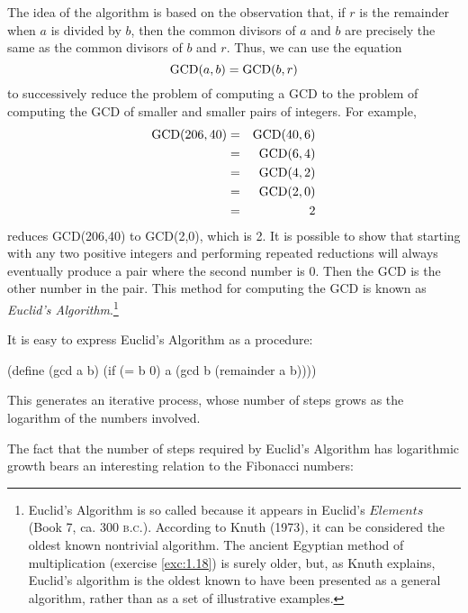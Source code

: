 The idea of the algorithm is based on the observation that, if $r$ is
the remainder when $a$ is divided by $b$, then the common divisors of
$a$ and $b$ are precisely the same as the common divisors of $b$ and
$r$.  Thus, we can use the equation $${\rm GCD}(a,b) = {\rm GCD}(b,r)$$
to successively reduce the problem of computing a GCD to the
problem of computing the GCD of smaller and smaller pairs of
integers.  For example,
\begin{eqnarray*}
 {\rm GCD}(206,40) & = & {\rm GCD}(40,6) \\
 & = & {\rm GCD}(6,4) \\
 & = & {\rm GCD}(4,2) \\
 & = & {\rm GCD}(2,0) \\
 & = & 2
\end{eqnarray*}
reduces GCD(206,40) to GCD(2,0), which is 2.  It is possible to show
that starting with any two positive integers and performing repeated
reductions will always eventually produce a pair where the second
number is 0.  Then the GCD is the other number in the pair.  This
method for computing the GCD is known as \textit{Euclid's
  Algorithm}.\footnote{Euclid's Algorithm is so called because it
  appears in Euclid's $Elements$ (Book 7, ca. 300 \textsc{b.c}.).
  According to Knuth (1973), it can be considered the oldest known
  nontrivial algorithm.  The ancient Egyptian method of multiplication
  (exercise \ref{exc:1.18}) is surely older, but, as Knuth explains,
  Euclid's algorithm is the oldest known to have been presented as a
  general algorithm, rather than as a set of illustrative examples.}

It is easy to express Euclid's Algorithm as a procedure:
\begin{schemedisplay}
(define (gcd a b)
  (if (= b 0)
      a
      (gcd b (remainder a b))))
\end{schemedisplay}
This generates an iterative process, whose number of steps grows as
the logarithm of the numbers involved.

The fact that the number of steps required by Euclid's Algorithm has
logarithmic growth bears an interesting relation to the Fibonacci
numbers:

